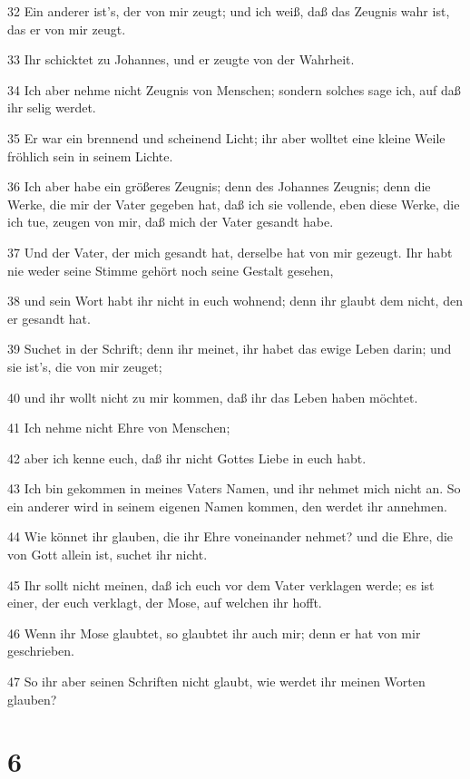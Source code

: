 \par 32 Ein anderer ist's, der von mir zeugt; und ich weiß, daß das Zeugnis wahr ist, das er von mir zeugt.
\par 33 Ihr schicktet zu Johannes, und er zeugte von der Wahrheit.
\par 34 Ich aber nehme nicht Zeugnis von Menschen; sondern solches sage ich, auf daß ihr selig werdet.
\par 35 Er war ein brennend und scheinend Licht; ihr aber wolltet eine kleine Weile fröhlich sein in seinem Lichte.
\par 36 Ich aber habe ein größeres Zeugnis; denn des Johannes Zeugnis; denn die Werke, die mir der Vater gegeben hat, daß ich sie vollende, eben diese Werke, die ich tue, zeugen von mir, daß mich der Vater gesandt habe.
\par 37 Und der Vater, der mich gesandt hat, derselbe hat von mir gezeugt. Ihr habt nie weder seine Stimme gehört noch seine Gestalt gesehen,
\par 38 und sein Wort habt ihr nicht in euch wohnend; denn ihr glaubt dem nicht, den er gesandt hat.
\par 39 Suchet in der Schrift; denn ihr meinet, ihr habet das ewige Leben darin; und sie ist's, die von mir zeuget;
\par 40 und ihr wollt nicht zu mir kommen, daß ihr das Leben haben möchtet.
\par 41 Ich nehme nicht Ehre von Menschen;
\par 42 aber ich kenne euch, daß ihr nicht Gottes Liebe in euch habt.
\par 43 Ich bin gekommen in meines Vaters Namen, und ihr nehmet mich nicht an. So ein anderer wird in seinem eigenen Namen kommen, den werdet ihr annehmen.
\par 44 Wie könnet ihr glauben, die ihr Ehre voneinander nehmet? und die Ehre, die von Gott allein ist, suchet ihr nicht.
\par 45 Ihr sollt nicht meinen, daß ich euch vor dem Vater verklagen werde; es ist einer, der euch verklagt, der Mose, auf welchen ihr hofft.
\par 46 Wenn ihr Mose glaubtet, so glaubtet ihr auch mir; denn er hat von mir geschrieben.
\par 47 So ihr aber seinen Schriften nicht glaubt, wie werdet ihr meinen Worten glauben?

\chapter{6}

